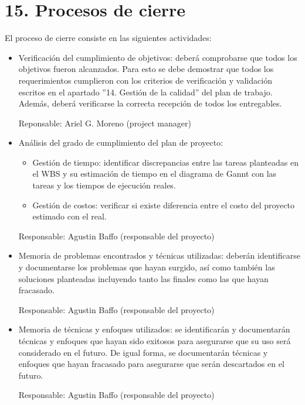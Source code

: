 \documentclass[
11pt, %
codirector, %
]{charter}
\begin{document}
\section{15. Procesos de cierre}    
\label{sec:cierre}

El proceso de cierre consiste en las siguientes actividades:

\begin{itemize}
\item Verificación del cumplimiento de objetivos: deberá comprobarse que todos los objetivos fueron alcanzados. Para esto se debe demostrar que todos los requerimientos cumplieron con los criterios de verificación y validación escritos en el apartado ''14. Gestión de la calidad'' del plan de trabajo. Además, deberá verificarse la correcta recepción de todos los entregables.

Reponsable: Ariel G. Moreno (project manager)


\item Análisis del grado de cumplimiento del plan de proyecto:

\begin{itemize}
\item  Gestión de tiempo: identificar discrepancias entre las tareas planteadas en el WBS y su estimación de tiempo en el diagrama de Gannt con las tareas y los tiempos de ejecución reales.
\item  Gestión de costos: verificar si existe diferencia entre el costo del proyecto estimado con el real.
\end{itemize}

Responsable: Agustin Baffo (responsable del proyecto)

\item Memoria de problemas encontrados y técnicas utilizadas:
deberán identificarse y documentarse los problemas que hayan surgido, así como también las soluciones planteadas incluyendo tanto las finales como las que hayan fracasado.

Responsable: Agustin Baffo (responsable del proyecto)


\item Memoria de técnicas y enfoques utilizados: se identificarán y documentarán técnicas y enfoques que hayan sido exitosos para asegurarse que su uso será considerado en el futuro. De igual forma, se documentarán técnicas y enfoques que hayan fracasado para asegurarse que serán descartados en el futuro.

Responsable: Agustin Baffo (responsable del proyecto)



\end{itemize}
\end{document}
